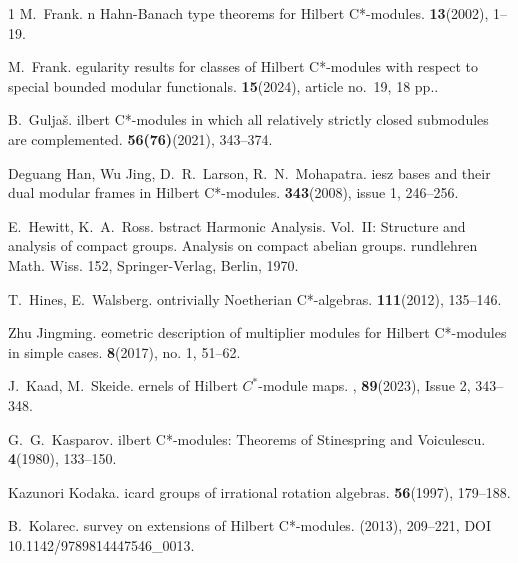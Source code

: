 \documentclass{amsart}
\theoremstyle{definition}
\begin{document}
\begin{thebibliography}{1}
{\sc M.~Frank}.
n {H}ahn-{B}anach type theorems for {H}ilbert {C}*-modules.
 {\bf 13}(2002), 1--19.

{\sc M.~Frank}.
egularity results for classes of {H}ilbert {C}*-modules with
respect to special bounded modular functionals.
 {\bf 15}(2024), article no.~19, 18 pp..

{\sc B.~Gulja{\v{s}}}.
ilbert {C}*-modules in which all relatively strictly closed submodules are complemented.
 {\bf 56(76)}(2021), 343--374.

{\sc Deguang Han, Wu Jing, D.~R.~Larson, R.~N.~Mohapatra}.
iesz bases and their dual modular frames in {H}ilbert {C}*-modules.
 {\bf 343}(2008), issue 1, 246--256.

{\sc E.~Hewitt, K.~A.~Ross}.
bstract {H}armonic {A}nalysis. {V}ol.~II: {S}tructure and analysis of compact groups. {A}nalysis on compact abelian groups. 
rundlehren {M}ath. {W}iss. 152, {S}pringer-{V}erlag, {B}erlin, 1970.

{\sc T.~Hines, E.~Walsberg}.
ontrivially {N}oetherian {C}*-algebras.
 {\bf 111}(2012), 135--146.

{\sc Zhu Jingming}.
eometric description of multiplier modules for {H}ilbert {C}*-modules in simple cases. 
 {\bf 8}(2017), no. 1, 51--62.

{\sc J.~Kaad, M.~Skeide}.
ernels of {H}ilbert ${C}^{*}$-module maps.
, {\bf 89}(2023), Issue 2, 343--348.

{\sc G.~G.~Kasparov}.
ilbert {C}*-modules: {T}heorems of {S}tinespring and {V}oiculescu.
 {\bf 4}(1980), 133--150.

{\sc Kazunori Kodaka}.
icard groups of irrational rotation algebras.
 {\bf 56}(1997), 179--188.

{\sc B.~Kolarec}.
 survey on extensions of {H}ilbert {C}*-modules.
 (2013), 209--221, DOI 10.1142/9789814447546{\_}0013.


\end{thebibliography}
\end{document}
